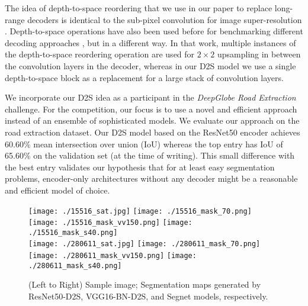 \documentclass[10pt,twocolumn,letterpaper]{article}
\begin{document}
The idea of depth-to-space reordering that we use in our paper to replace long-range decoders is identical to the sub-pixel convolution for image super-resolution \cite{depth-to-space}. Depth-to-space operations have also been used before for benchmarking different decoding approaches \cite{devil-decoder}, but in a different way. In that work, multiple instances of the depth-to-space reordering operation are used for $2\times 2$ upsampling in between the convolution layers in the decoder, whereas in our D2S model we use a single depth-to-space block as a replacement for a large stack of convolution layers.


We incorporate our D2S idea as a participant in the \textit{DeepGlobe Road Extraction} challenge. For the competition, our focus is to use a novel and efficient approach instead of an ensemble of sophisticated models. We evaluate our approach on the road extraction dataset. Our D2S model based on the ResNet50 encoder achieves 60.60\% mean intersection over union (IoU) whereas the top entry has IoU of 65.60\% on the validation set (at the time of writing). This small difference with the best entry validates our hypothesis that for at least easy segmentation problems, encoder-only architectures without any decoder might be a reasonable and efficient model of choice.

\begin{figure*}[t]
\centering
	\texttt{[image: ./15516\_sat.jpg]}
	\texttt{[image: ./15516\_mask\_70.png]}
	\texttt{[image: ./15516\_mask\_vv150.png]}
	\texttt{[image: ./15516\_mask\_s40.png]} \\
	\texttt{[image: ./280611\_sat.jpg]}
	\texttt{[image: ./280611\_mask\_70.png]}
	\texttt{[image: ./280611\_mask\_vv150.png]}
	\texttt{[image: ./280611\_mask\_s40.png]}
    \caption{(Left to Right) Sample image; Segmentation maps generated by ResNet50-D2S, VGG16-BN-D2S, and Segnet models, respectively.}
    \label{fig:sample_images}
\end{figure*}
\end{document}
